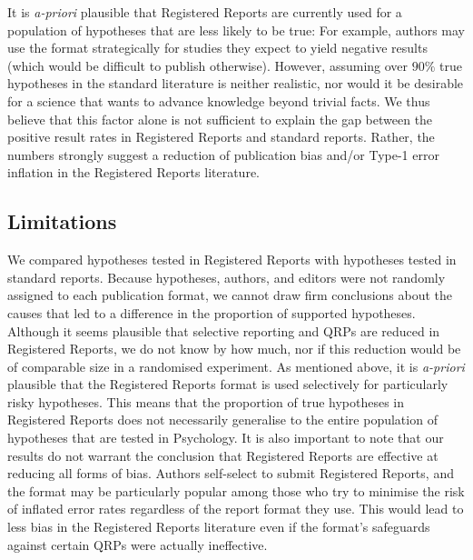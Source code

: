 \documentclass[british,,jou,floatsintext]{apa6}
\begin{document}
It is \emph{a-priori} plausible that Registered Reports are currently used for a population of hypotheses that are less likely to be true:
For example, authors may use the format strategically for studies they expect to yield negative results (which would be difficult to publish otherwise).
However, assuming over \(90\%\) true hypotheses in the standard literature is neither realistic, nor would it be desirable for a science that wants to advance knowledge beyond trivial facts.
We thus believe that this factor alone is not sufficient to explain the gap between the positive result rates in Registered Reports and standard reports.
Rather, the numbers strongly suggest a reduction of publication bias and/or Type-1 error inflation in the Registered Reports literature.

\hypertarget{limitations}{%
\subsection{Limitations}\label{limitations}}

We compared hypotheses tested in Registered Reports with hypotheses tested in standard reports.
Because hypotheses, authors, and editors were not randomly assigned to each publication format, we cannot draw firm conclusions about the causes that led to a difference in the proportion of supported hypotheses.
Although it seems plausible that selective reporting and QRPs are reduced in Registered Reports, we do not know by how much, nor if this reduction would be of comparable size in a randomised experiment.
As mentioned above, it is \emph{a-priori} plausible that the Registered Reports format is used selectively for particularly risky hypotheses.
This means that the proportion of true hypotheses in Registered Reports does not necessarily generalise to the entire population of hypotheses that are tested in Psychology.
It is also important to note that our results do not warrant the conclusion that Registered Reports are effective at reducing all forms of bias.
Authors self-select to submit Registered Reports, and the format may be particularly popular among those who try to minimise the risk of inflated error rates regardless of the report format they use.
This would lead to less bias in the Registered Reports literature even if the format's safeguards against certain QRPs were actually ineffective.
\end{document}
